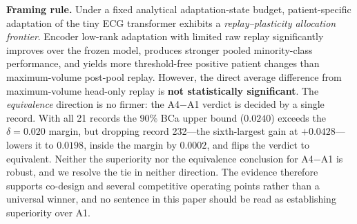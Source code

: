 \textbf{Framing rule.} Under a fixed analytical adaptation-state budget,
patient-specific adaptation of the tiny ECG transformer exhibits a
\emph{replay--plasticity allocation frontier}. Encoder low-rank adaptation with
limited raw replay significantly improves over the frozen model, produces
stronger pooled minority-class performance, and yields more threshold-free
positive patient changes than maximum-volume post-pool replay. However, the
direct average difference from maximum-volume head-only replay is
\textbf{not statistically significant}. The \emph{equivalence} direction is no
firmer: the A4$-$A1 verdict is decided by a single record. With all 21 records the
$90\%$ BCa upper bound ($0.0240$) exceeds the $\delta = 0.020$ margin, but dropping
record 232---the sixth-largest gain at $+0.0428$---lowers it to $0.0198$, inside
the margin by $0.0002$, and flips the verdict to equivalent. Neither the
superiority nor the equivalence conclusion for A4$-$A1 is robust, and we resolve
the tie in neither direction. The evidence therefore supports co-design
and several competitive operating points rather than a universal winner, and no
sentence in this paper should be read as establishing superiority over A1.
